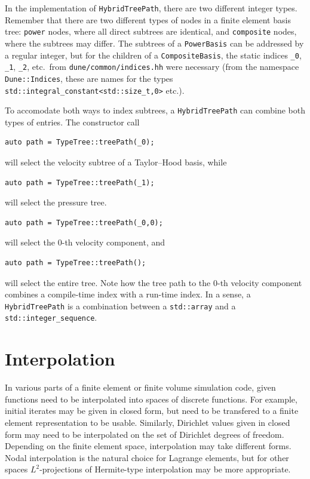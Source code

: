 \documentclass[a4paper,10pt,headings=normal,bibliography=totoc]{scrartcl}
\newcommand{\cpp}[1]{\lstinline[basicstyle=\ttfamily]!#1!}
\newcommand{\file}[1]{\texttt{#1}}
\begin{document}
In the implementation of \cpp{HybridTreePath}, there are two different integer types.  Remember that there are
two different types of nodes in a finite element basis tree: \cpp{power} nodes, where all direct subtrees
are identical, and \cpp{composite} nodes, where the subtrees may differ.
The subtrees of a \cpp{PowerBasis} can be addressed by a regular integer,
but for the children of a \cpp{CompositeBasis}, the static indices \cpp{_0}, \cpp{_1}, \cpp{_2}, etc.\
from \file{dune/common/indices.hh} were necessary (from the namespace \cpp{Dune::Indices}, these are names
for the types \cpp{std::integral_constant<std::size_t,0>} etc.).

To accomodate both ways to index subtrees, a \cpp{HybridTreePath} can combine both types of entries.
The constructor call
\begin{lstlisting}
auto path = TypeTree::treePath(_0);
\end{lstlisting}
will select the velocity subtree of a Taylor--Hood basis, while
\begin{lstlisting}
auto path = TypeTree::treePath(_1);
\end{lstlisting}
will select the pressure tree.
\begin{lstlisting}
auto path = TypeTree::treePath(_0,0);
\end{lstlisting}
will select the $0$-th velocity component, and
\begin{lstlisting}
auto path = TypeTree::treePath();
\end{lstlisting}
will select the entire tree.  Note how the tree path to the $0$-th velocity component combines a compile-time
index with a run-time index.  In a sense, a \cpp{HybridTreePath} is a combination between a \cpp{std::array}
and a \cpp{std::integer_sequence}.



\section{Interpolation}

In various parts of a finite element or finite volume simulation code, given functions need to be interpolated
into spaces of discrete functions.  For example, initial iterates may be given in closed form, but need to be
transfered to a finite element representation to be usable.  Similarly, Dirichlet values given in closed form
may need to be interpolated on the set of Dirichlet degrees of freedom.  Depending on the finite element space,
interpolation may take different forms.  Nodal interpolation is the natural choice for Lagrange elements, but
for other spaces $L^2$-projections of Hermite-type interpolation may be more appropriate.
\end{document}
